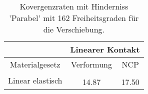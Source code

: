 \begin{table} 
\centering 
\begin{tabular}{c|cc|} 
\cline{2-3} 
 & \multicolumn{2}{|c|}{Linearer Kontakt} \\ 
\hline 
\multicolumn{1}{|c|}{Materialgesetz} & \multicolumn{1}{c|}{Verformung} & \multicolumn{1}{c|}{NCP} \\ 
\hline 
\multicolumn{1}{|c|}{\multirow{2}{*}{Linear elastisch}} &\multicolumn{1}{|c|}{} & \multicolumn{1}{|c|}{} \\ 
\multicolumn{1}{|c|}{} & \multicolumn{1}{|c|}{     14.87} & \multicolumn{1}{|c|}{     17.50} \\ 
\hline 
\end{tabular}\caption{Kovergenzraten mit Hinderniss 'Parabel' mit 162 Freiheitsgraden für die Verschiebung.}\label{tab:Rate_Parabel_level2}
\end{table} 
